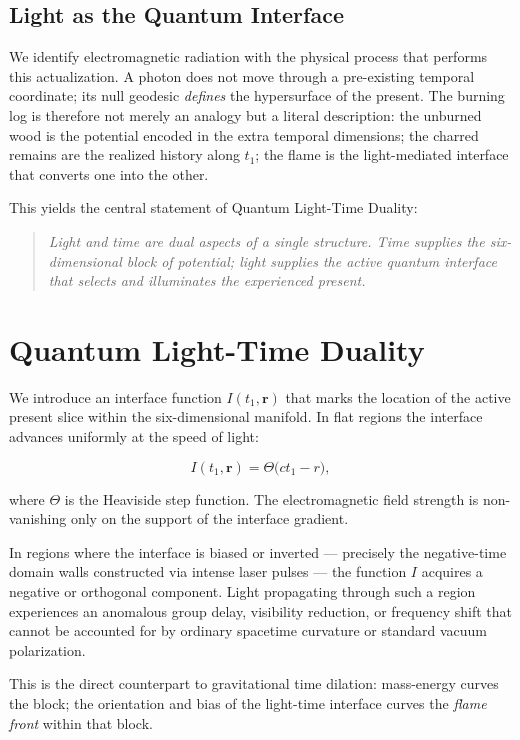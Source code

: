 \documentclass[11pt,a4paper]{article}
\begin{document}
\subsection{Light as the Quantum Interface}
We identify electromagnetic radiation with the physical process that performs this actualization. A photon does not move through a pre-existing temporal coordinate; its null geodesic \textit{defines} the hypersurface of the present. The burning log is therefore not merely an analogy but a literal description: the unburned wood is the potential encoded in the extra temporal dimensions; the charred remains are the realized history along $t_1$; the flame is the light-mediated interface that converts one into the other.

This yields the central statement of Quantum Light-Time Duality:

\begin{quote}
\textit{Light and time are dual aspects of a single structure. Time supplies the six-dimensional block of potential; light supplies the active quantum interface that selects and illuminates the experienced present.}
\end{quote}

\section{Quantum Light-Time Duality}

We introduce an interface function $I(t_1, \mathbf{r})$ that marks the location of the active present slice within the six-dimensional manifold. In flat regions the interface advances uniformly at the speed of light:

\[
I(t_1, \mathbf{r}) = \Theta\bigl(c t_1 - r\bigr),
\]

where $\Theta$ is the Heaviside step function. The electromagnetic field strength is non-vanishing only on the support of the interface gradient.

In regions where the interface is biased or inverted — precisely the negative-time domain walls constructed via intense laser pulses — the function $I$ acquires a negative or orthogonal component. Light propagating through such a region experiences an anomalous group delay, visibility reduction, or frequency shift that cannot be accounted for by ordinary spacetime curvature or standard vacuum polarization.

This is the direct counterpart to gravitational time dilation: mass-energy curves the block; the orientation and bias of the light-time interface curves the \textit{flame front} within that block.
\end{document}
